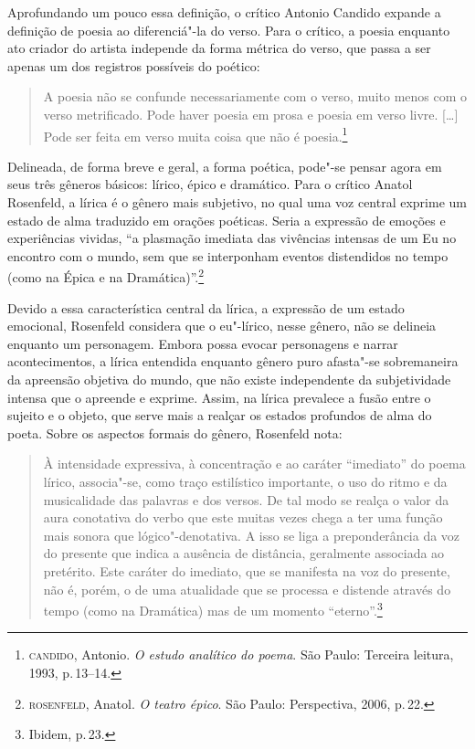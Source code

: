 \documentclass[11pt]{extarticle}
\begin{document}
Aprofundando um pouco essa definição, o crítico Antonio Candido expande a definição de poesia ao diferenciá"-la do verso.
Para o crítico, a poesia enquanto ato criador do artista independe da forma métrica do verso, que passa a ser apenas um dos registros possíveis do poético:

\begin{quote}
A poesia não se confunde necessariamente com o verso, muito menos com o verso metrificado. Pode haver poesia em prosa e poesia em verso livre. [\ldots]
Pode ser feita em verso muita coisa que não é poesia.\footnote{\textsc{candido}, Antonio. \textit{O estudo analítico do poema}. São Paulo: Terceira leitura, 1993, p.\,13--14.}
\end{quote}

Delineada, de forma breve e geral, a forma poética, pode"-se pensar agora em seus três gêneros básicos: lírico, épico e dramático.
Para o crítico Anatol Rosenfeld, a lírica é o gênero mais subjetivo, no qual uma voz central exprime um estado de alma traduzido em orações poéticas.
Seria a expressão de emoções e experiências vividas, ``a plasmação imediata das vivências intensas de um Eu no encontro com o mundo, sem que se interponham eventos distendidos no tempo (como na Épica e na Dramática)''.\footnote{\textsc{rosenfeld}, Anatol. \textit{O teatro épico}. São Paulo: Perspectiva, 2006, p.\,22.}

Devido a essa característica central da lírica, a expressão de um estado emocional, Rosenfeld considera que o eu"-lírico, nesse gênero, não se delineia enquanto um personagem. Embora possa evocar personagens e narrar acontecimentos, a lírica entendida enquanto gênero puro afasta"-se sobremaneira da apreensão objetiva do mundo, que não existe independente da subjetividade intensa que o apreende e exprime. Assim, na lírica prevalece a fusão entre o sujeito e o objeto, que serve mais a realçar os estados profundos de alma do poeta.
Sobre os aspectos formais do gênero, Rosenfeld nota:

\begin{quote}
À intensidade expressiva, à concentração e ao caráter ``imediato'' do poema lírico, associa"-se, como traço estilístico importante, o uso do ritmo e da musicalidade das palavras e dos versos. De tal modo se realça o valor da aura conotativa do verbo que este muitas vezes chega a ter uma função mais sonora que lógico"-denotativa. A isso se liga a preponderância da voz do presente que indica a ausência de distância, geralmente associada ao pretérito. Este caráter do imediato, que se manifesta na voz do presente, não é, porém, o de uma atualidade que se processa e distende através do tempo (como na Dramática) mas de um momento ``eterno''.\footnote{Ibidem, p.\,23.}
\end{quote}
\end{document}
